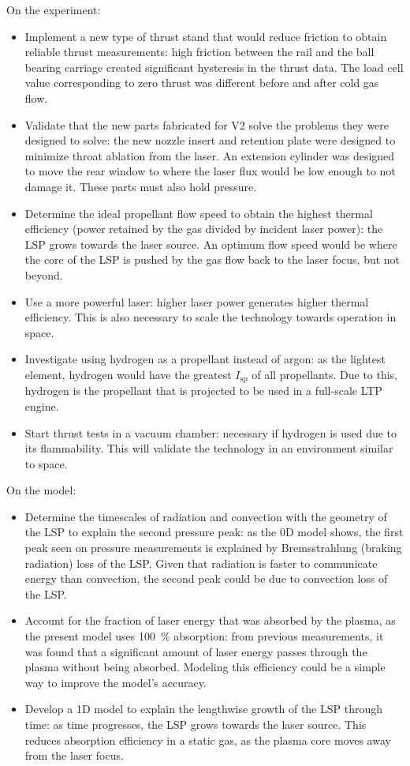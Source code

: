         On the experiment:
        \begin{itemize}
            \item Implement a new type of thrust stand that would reduce friction to obtain reliable thrust measurements: high friction between the rail and the ball bearing carriage created significant hysteresis in the thrust data. The load cell value corresponding to zero thrust was different before and after cold gas flow.
            \item Validate that the new parts fabricated for V2 solve the problems they were designed to solve: the new nozzle insert and retention plate were designed to minimize throat ablation from the laser. An extension cylinder was designed to move the rear window to where the laser flux would be low enough to not damage it. These parts must also hold pressure.
            \item Determine the ideal propellant flow speed to obtain the highest thermal efficiency (power retained by the gas divided by incident laser power): the LSP grows towards the laser source. An optimum flow speed would be where the core of the LSP is pushed by the gas flow back to the laser focus, but not beyond. 
            \item Use a more powerful laser: higher laser power generates higher thermal efficiency. This is also necessary to scale the technology towards operation in space.
            \item Investigate using hydrogen as a propellant instead of argon: as the lightest element, hydrogen would have the greatest $I_\mathrm{sp}$ of all propellants. Due to this, hydrogen is the propellant that is projected to be used in a full-scale LTP engine.
            \item Start thrust tests in a vacuum chamber: necessary if hydrogen is used due to its flammability. This will validate the technology in an environment similar to space.
        \end{itemize}

        On the model:
        \begin{itemize}
            \item Determine the timescales of radiation and convection with the geometry of the LSP to explain the second pressure peak: as the 0D model shows, the first peak seen on pressure measurements is explained by Bremsstrahlung (braking radiation) loss of the LSP. Given that radiation is faster to communicate energy than convection, the second peak could be due to convection loss of the LSP.
            \item Account for the fraction of laser energy that was absorbed by the plasma, as the present model uses \qty{100}{\%} absorption: from previous measurements, it was found that a significant amount of laser energy passes through the plasma without being absorbed. Modeling this efficiency could be a simple way to improve the model's accuracy.
            \item Develop a 1D model to explain the lengthwise growth of the LSP through time: as time progresses, the LSP grows towards the laser source. This reduces absorption efficiency in a static gas, as the plasma core moves away from the laser focus.
        \end{itemize}
        